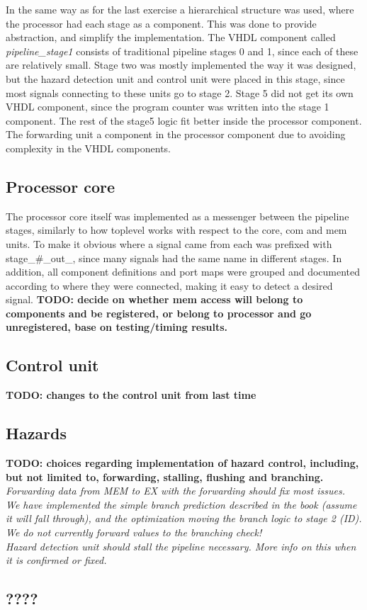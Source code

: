 In the same way as for the last exercise a hierarchical structure was used,
where the processor had each stage as a component. This was done to provide
abstraction, and simplify the implementation. The VHDL component called
\emph{pipeline\_stage1} consists of traditional pipeline stages 0 and 1, since
each of these are relatively small. Stage two was mostly implemented the way it
was designed, but the hazard detection unit and control unit were placed in this
stage, since most signals connecting to these units go to stage 2. Stage 5 did
not get its own VHDL component, since the program counter was written into the
stage 1 component. The rest of the stage5 logic fit better inside the processor
component. The forwarding unit a component in the processor component due to
avoiding complexity in the VHDL components.
\subsection{Processor core}
The processor core itself was implemented as a messenger between the pipeline
stages, similarly to how toplevel works with respect to the core, com and mem
units. To make it obvious where a signal came from each was prefixed with
stage\_\#\_out\_, since many signals had the same name in different stages. In
addition, all component definitions and port maps were grouped and documented
according to where they were connected, making it easy to detect a desired
signal.
\textbf{TODO: decide on whether mem access will belong to components and be registered, or belong to processor and go unregistered, base on testing/timing results.}

\subsection{Control unit}
\textbf{TODO: changes to the control unit from last time}
\subsection{Hazards}
\textbf{TODO: choices regarding implementation of hazard control, including, but not limited to, forwarding, stalling, flushing and branching.}
\emph{Forwarding data from MEM to EX with the forwarding should fix most issues.
\\
We have implemented the simple branch prediction described in the book
(assume it will fall through), and the optimization moving the branch logic to
stage 2 (ID). We do not currently forward values to the branching check!
\\
Hazard detection unit should stall the pipeline necessary. More info on this
when it is confirmed or fixed.}

\subsection{????}